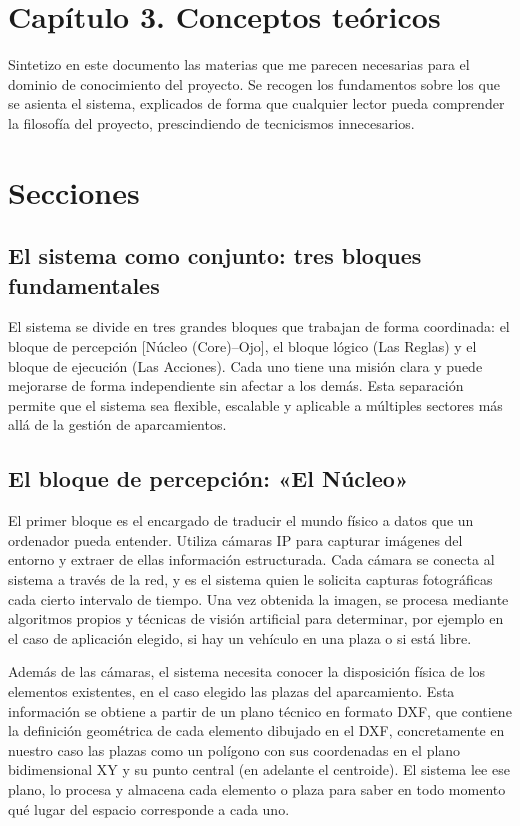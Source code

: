 \documentclass[12pt,a4paper]{article}
\newcounter{chapter}
\newcommand{\capitulo}[2]{%
	\setcounter{chapter}{#1}%
	\setcounter{section}{0}%
	\section*{Capítulo #1. #2}%
}
\begin{document}
\capitulo{3}{Conceptos teóricos}

Sintetizo en este documento las materias que me parecen necesarias para el dominio de conocimiento del proyecto. Se recogen los fundamentos sobre los que se asienta el sistema, explicados de forma que cualquier lector pueda comprender la filosofía del proyecto, prescindiendo de tecnicismos innecesarios.

\section{Secciones}

\subsection{El sistema como conjunto: tres bloques fundamentales}

El sistema se divide en tres grandes bloques que trabajan de forma coordinada: el bloque de percepción [Núcleo (Core)--Ojo], el bloque lógico (Las Reglas) y el bloque de ejecución (Las Acciones). Cada uno tiene una misión clara y puede mejorarse de forma independiente sin afectar a los demás. Esta separación permite que el sistema sea flexible, escalable y aplicable a múltiples sectores más allá de la gestión de aparcamientos.

\subsection{El bloque de percepción: «El Núcleo»}

El primer bloque es el encargado de traducir el mundo físico a datos que un ordenador pueda entender. Utiliza cámaras IP para capturar imágenes del entorno y extraer de ellas información estructurada. Cada cámara se conecta al sistema a través de la red, y es el sistema quien le solicita capturas fotográficas cada cierto intervalo de tiempo. Una vez obtenida la imagen, se procesa mediante algoritmos propios y técnicas de visión artificial para determinar, por ejemplo en el caso de aplicación elegido, si hay un vehículo en una plaza o si está libre.

Además de las cámaras, el sistema necesita conocer la disposición física de los elementos existentes, en el caso elegido las plazas del aparcamiento. Esta información se obtiene a partir de un plano técnico en formato DXF, que contiene la definición geométrica de cada elemento dibujado en el DXF, concretamente en nuestro caso las plazas como un polígono con sus coordenadas en el plano bidimensional XY y su punto central (en adelante el centroide). El sistema lee ese plano, lo procesa y almacena cada elemento o plaza para saber en todo momento qué lugar del espacio corresponde a cada uno.
\end{document}
